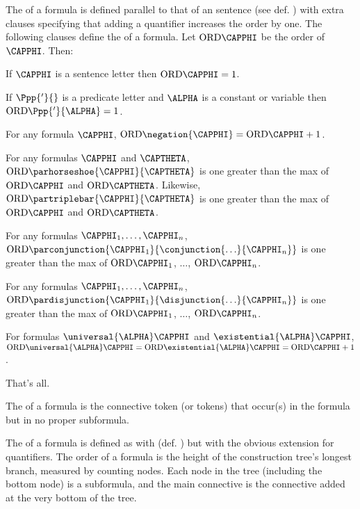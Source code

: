 \begin{majorILnc}{}
The  of a formula is defined parallel to that of an \GSL{} sentence (see def. ) with extra clauses specifying that adding a quantifier increases the order by one.
The following clauses define the  of a formula. Let $\ORD{\CAPPHI}$ be the order of $\CAPPHI$. Then: 
\begin{cenumerate}
\item If $\CAPPHI$ is a sentence letter then $\ORD{\CAPPHI}=1$.
\item If $\Ppp{'}{}$ is a predicate letter and $\ALPHA$ is a constant or variable then $\ORD{\Ppp{'}{\ALPHA}}=1$.
\item For any formula $\CAPPHI$, $\ORD{\negation{\CAPPHI}}=\ORD{\CAPPHI}+1$.
\item For any formulas $\CAPPHI$ and $\CAPTHETA$, $\ORD{\parhorseshoe{\CAPPHI}{\CAPTHETA}}$ is one greater than the max of $\ORD{\CAPPHI}$ and $\ORD{\CAPTHETA}$. Likewise, $\ORD{\partriplebar{\CAPPHI}{\CAPTHETA}}$ is one greater than the max of $\ORD{\CAPPHI}$ and $\ORD{\CAPTHETA}$.
\item For any formulas $\CAPPHI_1,\ldots,\CAPPHI_\integer{n}$, $\ORD{\parconjunction{\CAPPHI_1}{\conjunction{\ldots}{\CAPPHI_\integer{n}}}}$ is one greater than the max of $\ORD{\CAPPHI_1}$, $\ldots$, $\ORD{\CAPPHI_\integer{n}}$.
\item For any formulas $\CAPPHI_1,\ldots,\CAPPHI_\integer{n}$, $\ORD{\pardisjunction{\CAPPHI_1}{\disjunction{\ldots}{\CAPPHI_\integer{n}}}}$ is one greater than the max of $\ORD{\CAPPHI_1}$, $\ldots$, $\ORD{\CAPPHI_\integer{n}}$. 
\item For formulas $\universal{\ALPHA}\CAPPHI$ and $\existential{\ALPHA}\CAPPHI$, $\ORD{\universal{\ALPHA}\CAPPHI}=\ORD{\existential{\ALPHA}\CAPPHI}=\ORD{\CAPPHI}+1$.
\item That's all.
\end{cenumerate}
\end{majorILnc}
\begin{majorILnc}{}
The  of a formula is the connective token (or tokens) that occur(s) in the formula but in no proper subformula.
\end{majorILnc}
\begin{majorILnc}{}
The  of a formula is defined as with \GSL{} (def. ) but with the obvious extension for quantifiers. 
The order of a formula is the height of the construction tree's longest branch, measured by counting nodes.  Each node in the tree (including the bottom node) is a subformula, and the main connective is the connective added at the very bottom of the tree. 
\end{majorILnc}
